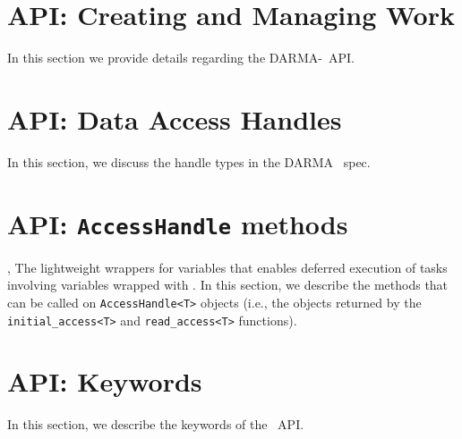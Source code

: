 
\lstMakeShortInline[style=CppCodeInlineStyle]{\|}

\section{API: Creating and Managing Work}
In this section we provide details regarding the DARMA-\specVersion\ \gls{API}.



\clearpage

\clearpage

\clearpage

\clearpage


\section{API: Data Access Handles}

In this section, we discuss the handle types in the DARMA \specVersion\ spec.

\clearpage

\clearpage

\section{API: \texttt{AccessHandle} methods}
,  The lightweight wrappers for variables that enables deferred execution of tasks involving variables wrapped with . 
In this section, we describe the methods that can be called 
on \texttt{AccessHandle<T>} objects (i.e., the objects returned by the 
\texttt{initial\_access<T>} and \texttt{read\_access<T>} functions).



\clearpage

\clearpage

\clearpage

\clearpage

\clearpage

\clearpage

\clearpage

\clearpage

\section{API: Keywords}

In this section, we describe the keywords of the \specVersion\ API. 


\clearpage

\clearpage


\lstDeleteShortInline{\|}
